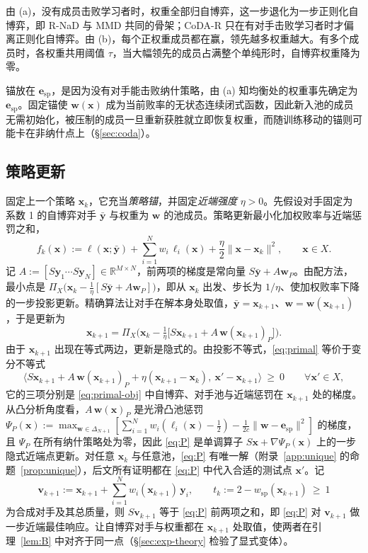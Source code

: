 \documentclass{article}
\theoremstyle{plain}
\theoremstyle{remark}
\newcommand{\Proj}{\Pi}
\newcommand{\simplex}{\Delta}
\newcommand{\bx}{{\bm{x}}}
\newcommand{\by}{{\bm{y}}}
\newcommand{\bv}{{\bm{v}}}
\newcommand{\bw}{{\bm{w}}}
\newcommand{\be}{{\bm{e}}}
\newcommand{\esp}{\be_{\mathrm{sp}}}
\newcommand{\wsp}{w_{\mathrm{sp}}}
\newcommand{\codar}{CoDA-R}
\begin{document}
由 (a)，没有成员击败学习者时，权重全部归自博弈，这一步退化为一步正则化自博弈，即 R-NaD 与 MMD 共同的骨架；\codar{} 只在有对手击败学习者时才偏离正则化自博弈。由 (b)，每个正权重成员都在赢，领先越多权重越大。有多个成员时，各权重共用阈值 $\tau$，当大幅领先的成员占满整个单纯形时，自博弈权重降为零。

锚放在 $\esp$，是因为没有对手能击败纳什策略，由 (a) 知均衡处的权重事先确定为 $\esp$。固定锚使 $\bw(\bx)$ 成为当前败率的无状态连续闭式函数，因此新入池的成员无需初始化，被压制的成员一旦重新获胜就立即恢复权重，而随训练移动的锚则可能卡在非纳什点上（\S\ref{sec:coda}）。

\subsection{策略更新}
\label{sec:primal}

固定上一个策略 $\bx_k$，它充当\emph{策略锚}，并固定\emph{近端强度} $\eta>0$。先假设对手固定为系数 1 的自博弈对手 $\bar{\by}$ 与权重为 $\bw$ 的池成员。策略更新最小化加权败率与近端惩罚之和，
\begin{equation}
f_k(\bx):=\ell(\bx;\bar{\by})+\sum_{i=1}^Nw_i\,\ell_i(\bx)+\frac\eta2\|\bx-\bx_k\|^2,\qquad \bx\in X .
\label{eq:primal-obj}
\end{equation}
记 $A:=[S\by_1\cdots S\by_N]\in\mathbb R^{M\times N}$，前两项的梯度是常向量 $S\bar{\by}+A\bw_P$。由配方法，最小点是 $\Proj_X\big(\bx_k-\tfrac1\eta[S\bar{\by}+A\bw_P]\big)$，即从 $\bx_k$ 出发、步长为 $1/\eta$、使加权败率下降的一步投影更新。精确算法让对手在解本身处取值，$\bar{\by}=\bx_{k+1}$、$\bw=\bw(\bx_{k+1})$，于是更新为
\begin{equation}
\bx_{k+1}=\Proj_X\Big(\bx_k-\tfrac1\eta\big[S\bx_{k+1}+A\,\bw(\bx_{k+1})_P\big]\Big).
\label{eq:primal}
\end{equation}
由于 $\bx_{k+1}$ 出现在等式两边，更新是隐式的。由投影不等式，\eqref{eq:primal} 等价于变分不等式
\begin{equation}
\big\langle S\bx_{k+1}+A\,\bw(\bx_{k+1})_P+\eta(\bx_{k+1}-\bx_k),\ \bx'-\bx_{k+1}\big\rangle\ \ge\ 0\qquad\forall \bx'\in X ,
\label{eq:P}
\end{equation}
它的三项分别是 \eqref{eq:primal-obj} 中自博弈、对手池与近端惩罚在 $\bx_{k+1}$ 处的梯度。从凸分析角度看，$A\,\bw(\bx)_P$ 是光滑凸池惩罚 $\Psi_P(\bx):=\max_{\bw\in\simplex_{N+1}}[\sum_{i=1}^Nw_i(\ell_i(\bx)-\tfrac12)-\tfrac1{2c}\|\bw-\esp\|^2]$ 的梯度，且 $\Psi_P$ 在所有纳什策略处为零，因此 \eqref{eq:P} 是单调算子 $S\bx+\nabla\Psi_P(\bx)$ 上的一步隐式近端点更新。对任意 $\bx_k$ 与任意池，\eqref{eq:P} 有唯一解（附录~\ref{app:unique} 的命题~\ref{prop:unique}），后文所有证明都在 \eqref{eq:P} 中代入合适的测试点 $\bx'$。记
\[
\bv_{k+1}:=\bx_{k+1}+\sum_{i=1}^Nw_i(\bx_{k+1})\,\by_i,\qquad t_k:=2-\wsp(\bx_{k+1})\ \ge\ 1
\]
为合成对手及其总质量，则 $S\bv_{k+1}$ 等于 \eqref{eq:P} 前两项之和，即 \eqref{eq:P} 对 $\bv_{k+1}$ 做一步近端最佳响应。让自博弈对手与权重都在 $\bx_{k+1}$ 处取值，使两者在引理~\ref{lem:B} 中对齐于同一点（\S\ref{sec:exp-theory} 检验了显式变体）。
\end{document}
